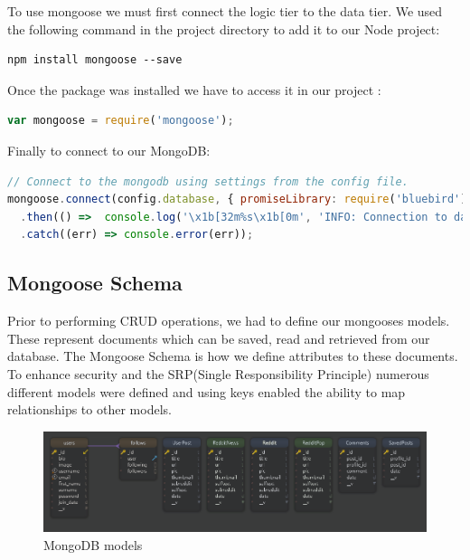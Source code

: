 To use mongoose we must first connect the logic tier to the data tier. We used the following command in the project directory to add it to our Node project:
\begin{verbatim}
npm install mongoose --save
\end{verbatim}

Once the package was installed we have to access it in our project :
\begin{lstlisting}[language=JavaScript]
var mongoose = require('mongoose');
\end{lstlisting}

Finally to connect to our MongoDB:
\begin{lstlisting}[language=JavaScript]
// Connect to the mongodb using settings from the config file.
mongoose.connect(config.database, { promiseLibrary: require('bluebird') })
  .then(() =>  console.log('\x1b[32m%s\x1b[0m', 'INFO: Connection to database succesfull'))
  .catch((err) => console.error(err));
\end{lstlisting}

\subsection{Mongoose Schema}
Prior to performing CRUD operations, we had to define our mongooses models. These represent documents which can be saved, read and retrieved from our database. The Mongoose Schema is how we define attributes to these documents. To enhance security and the SRP(Single Responsibility Principle) numerous different models were defined and using keys enabled the ability to map relationships to other models.

\begin{figure}[H]
  \includegraphics[width=\linewidth]{img/schemas.PNG}
  \caption{MongoDB models}
  \label{fig:schema}
\end{figure}

